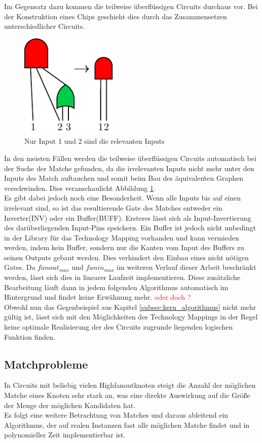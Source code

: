 \documentclass[11pt, a4paper, german]{article}
\newcommand{\TM}{Technology  Mapping }
\begin{document}
Im Gegensatz dazu kommen die teilweise überflüssigen Circuits durchaus vor. Bei der Konstruktion eines Chips geschieht dies durch das Zusammensetzen unterschiedlicher Circuits.\\
 \begin{figure}
		\includegraphics[height = 5cm]{pictures/compiled/partly_redundant}
		\caption{Nur Input 1 und 2 sind die relevanten Inputs}
		\label{bild:partly_redundant}
\end{figure}
In den meisten Fällen werden die teilweise überflüssigen Circuits automatisch bei der  Suche der Matche gefunden, da die irrelevanten Inputs nicht mehr unter den Inputs des Match auftauchen und somit beim Bau des äquivalenten Graphen verschwinden. Dies veranschaulicht Abbildung \ref{bild:partly_redundant}. \\
Es gibt dabei jedoch noch eine Besonderheit. Wenn alle Inputs bis auf einen irrelevant sind, so ist das resultierende Gate des Matches entweder ein Inverter(INV) oder ein Buffer(BUFF). Ersteres lässt sich als Input-Invertierung des darüberliegenden Input-Pins speichern. Ein Buffer ist jedoch nicht unbedingt in der Library für das \TM vorhanden und kann vermieden werden, indem kein Buffer, sondern nur die Kanten vom Input des Buffers zu seinen Outputs gebaut werden. Dies verhindert den Einbau eines nicht nötigen Gates. Da $fanout_{max}$ und $fanin_{max}$ im weiteren Verlauf dieser Arbeit beschränkt werden, lässt sich dies in linearer Laufzeit implementieren. Diese zusätzliche Bearbeitung läuft dann in jedem folgenden Algorithmus automatisch im Hintergrund und findet keine Erwähnung mehr. \textcolor{red}{oder doch ?}\\
 Obwohl nun das Gegenbeispiel aus Kapitel \ref{subsec:kern_algorithmus} nicht mehr gültig ist, lässt sich mit den Möglichkeiten des Technology Mappings in der Regel keine optimale Realisierung der des Circuits zugrunde liegenden logischen Funktion finden.
 
 
\subsection{Matchprobleme}
\label{subsec:match_kandidaten}
In Circuits mit beliebig vielen Highfanoutknoten steigt die Anzahl der möglichen Matche eines Knoten sehr stark an, was eine direkte Auswirkung auf die Größe der Menge der möglichen Kandidaten hat. \\
Es folgt eine weitere Betrachtung von Matches und daraus ableitend ein Algorithmus, der auf realen Instanzen fast alle möglichen Matche findet und in polynomieller Zeit implementierbar ist.
\end{document}
